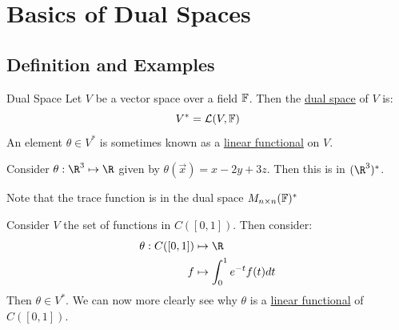 \documentclass[../Main.tex]{subfiles}
\begin{document}
\section{Basics of Dual Spaces}
\subsection{Definition and Examples}
\begin{definition}{Dual Space}
    Let $V$ be a vector space over a field $\mathbb{F}$. Then the \underline{dual space} of $V$ is:
    \begin{equation*}
        V^* = \mathcal{L}(V, \mathbb{F})
    \end{equation*}
    An element $\theta \in V^*$ is sometimes known as a \underline{linear functional} on $V$.
\end{definition}
\begin{examples}{}
    \item Consider $\theta : \R^3 \mapsto \R$ given by $\theta(\vec{x}) = x - 2y + 3z$. Then this is in $(\R^3)^*$.
    \item Note that the trace function is in the dual space $M_{n \times n}(\mathbb{F})^*$
    \item Consider $V$ the set of functions in $C([0, 1])$. Then consider:
        \begin{align*}
            \theta : C([0, 1]) &\mapsto \R\\
            f &\mapsto \int_{0}^{1} e^{-t}f(t) dt 
        \end{align*}
        Then $\theta \in V^*$. We can now more clearly see why $\theta$ is a \underline{linear functional} of $C([0, 1])$.
\end{examples}
\end{document}
